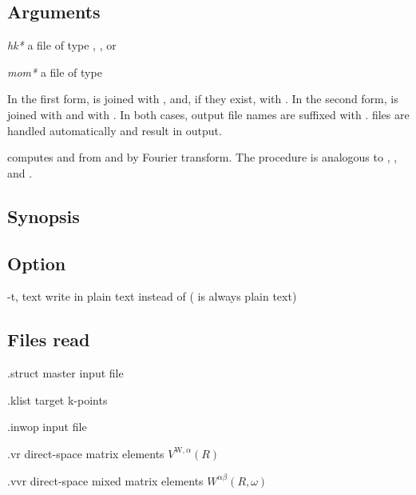 \subsection{Arguments}
\begin{options}
\item [\itshape hk*] a file of type ,
  , or 
\item [\itshape mom*] a file of type 
\end{options}
%
In the first form,  is joined with
, and, if they exist,  with
.  In the second form,  is
joined with  and  with .  In
both cases, output file names are suffixed with .
  files are handled automatically and
result in  output.



\convvr computes  and  from
 and  by Fourier transform.  The
procedure is analogous to , , and
.

\subsection{Synopsis}
\begin{usage}
  \convvr [\td text] \case
\end{usage}

\subsection{Option}
\begin{options}
\item [-t, \td text] write  in plain text instead
  of  ( is always plain text)
\end{options}

\subsection{Files read}
\begin{options}
\item[\case.struct] \wien master input file
\item[\case.klist] target k-points
\item[\case.inwop] \woprog input file
\item[\case.vr] direct-space matrix elements $V^{\text{W},α}(R)$
\item[\case.vvr] direct-space mixed matrix elements $W^{αβ}(R, ω)$
\end{options}

